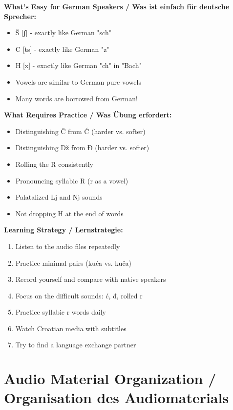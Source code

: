 \begin{tcolorbox}[colback=lightblue!20, colframe=croatianblue, title=\textbf{Special Tips / Spezielle Tipps}]

\textbf{What's Easy for German Speakers / Was ist einfach für deutsche Sprecher:}
\begin{itemize}
    \item Š [ʃ] - exactly like German "sch"
    \item C [ts] - exactly like German "z"
    \item H [x] - exactly like German "ch" in "Bach"
    \item Vowels are similar to German pure vowels
    \item Many words are borrowed from German!
\end{itemize}

\textbf{What Requires Practice / Was Übung erfordert:}
\begin{itemize}
    \item Distinguishing Č from Ć (harder vs. softer)
    \item Distinguishing Dž from Đ (harder vs. softer)
    \item Rolling the R consistently
    \item Pronouncing syllabic R (r as a vowel)
    \item Palatalized Lj and Nj sounds
    \item Not dropping H at the end of words
\end{itemize}

\textbf{Learning Strategy / Lernstrategie:}
\begin{enumerate}
    \item Listen to the audio files repeatedly
    \item Practice minimal pairs (kuća vs. kuča)
    \item Record yourself and compare with native speakers
    \item Focus on the difficult sounds: ć, đ, rolled r
    \item Practice syllabic r words daily
    \item Watch Croatian media with subtitles
    \item Try to find a language exchange partner
\end{enumerate}

\end{tcolorbox}

\section{Audio Material Organization / Organisation des Audiomaterials}

